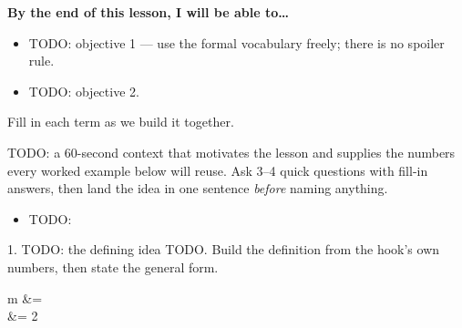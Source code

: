 \documentclass[10pt]{article}
\begin{document}

\vspace{0.10in}

\begin{objectivebox}
\textbf{By the end of this lesson, I will be able to\dots}
\begin{itemize}\setlength{\itemsep}{2pt}
  \item TODO: objective 1 --- use the formal vocabulary freely; there is no spoiler rule.
  \item TODO: objective 2.
\end{itemize}
\end{objectivebox}

\vspace{0.05in}

\begin{vocabbox}
\small
Fill in each term as we build it together.
\par\vspace{2pt}   %
\end{vocabbox}

\begin{hookbox}
TODO: a 60-second context that motivates the lesson and supplies the numbers every worked example
below will reuse. Ask 3--4 quick questions with fill-in answers, then land the idea in one
sentence \emph{before} naming anything.
\begin{itemize}\setlength{\itemsep}{1pt}
  \item TODO: \blank{1.0cm} \quad \blank{1.0cm} \quad \blank{1.0cm}
\end{itemize}
\end{hookbox}

\boxguard[24]
\begin{notesbox}{1. TODO: the defining idea}
TODO. Build the definition from the hook's own numbers, then state the general form.
\begin{work}
  m &=  \\
    &= 2
\end{work}
\end{notesbox}
\end{document}
